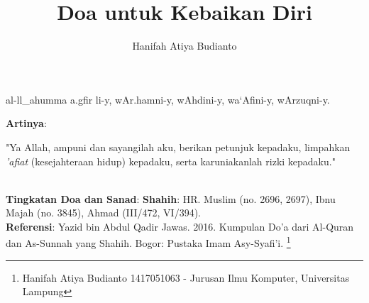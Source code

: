 \documentclass[a4paper,12pt]{article}
\title{\Large Doa untuk Kebaikan Diri}
\author{\calligra Hanifah Atiya Budianto}
\begin{document}
\sffamily
\maketitle 
\fullvocalize
{}
\begin{arabtext}
\noindent
al-ll_ahumma a.gfir li-y, wAr.hamni-y, wAhdini-y, wa`Afini-y, wArzuqni-y.\\
\end{arabtext}
\noindent
\textbf{Artinya}:
\par
\indent
"Ya Allah, ampuni dan sayangilah aku, berikan petunjuk kepadaku, limpahkan 
\textit{'afiat} (kesejahteraan hidup) kepadaku, serta karuniakanlah rizki 
kepadaku."\\\\
\par
\noindent
\textbf{Tingkatan Doa dan Sanad}: \textbf{Shahih}: HR. Muslim (no. 2696, 
2697), Ibnu Majah (no. 3845), Ahmad (III/472, VI/394).\\
\textbf{Referensi}: Yazid bin Abdul Qadir Jawas. 2016. Kumpulan Do'a dari
Al-Quran dan As-Sunnah yang Shahih. Bogor: Pustaka Imam Asy-Syafi'i.
\footnote{Hanifah Atiya Budianto 1417051063 - Jurusan Ilmu Komputer,
Universitas Lampung}
\end{document}
